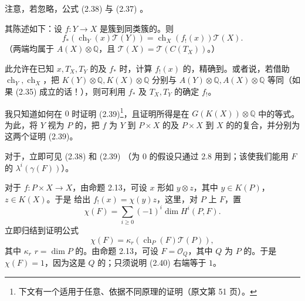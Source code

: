 注意，若忽略，公式 (2.38) 与 (2.37) 。

其陈述如下：设 $f:Y\to X$ 是簇到同类簇的。则
\[
f_*(\operatorname{ch}_Y(x)\mathscr T(Y))=\operatorname{ch}_X(f_!(x))\mathscr T(X).\tag{2.39}
\]
（两端均属于 $A(X)\otimes\mathbb Q$，且 $\mathscr T(X)=\mathscr T(C(T_X))$。）

此允许在已知 $x,T_X,T_Y$ 的及 $f_*$ 时，计算 $f_!(x)$ 的，精确到。或者说，若借助 $\operatorname{ch}_Y,\operatorname{ch}_X$，把 $K(Y)\otimes\mathbb Q,K(X)\otimes\mathbb Q$ 分别与 $A(Y)\otimes\mathbb Q,A(X)\otimes\mathbb Q$ 等同（如果 (2.35) 成立的话！），则可利用 $f_*$ 及 $T_X,T_Y$ 的确定 $f_!$。

我只知道如何在 $0$ 时证明 (2.39)\footnote{下文有一个适用于任意、依据不同原理的证明（原文第 51 页）。}，且证明所得是在 $G(K(X))\otimes\mathbb Q$ 中的等式。为此，将 $Y$ 视为 $P$ 的，把 $f$ 为 $Y$ 到 $P\times X$ 的及 $P\times X$ 到 $X$ 的的复合，并分别为这两个证明 (2.39)。

对于，立即可见 (2.38) 和 (2.39) （为 $0$ 的假设只通过 2.8 用到；该使我们能用 $F$ 的 $\lambda^i(\gamma(F))$）。

对于 $f:P\times X\to X$，由命题 2.13，可设 $x$ 形如 $y\otimes z$，其中 $y\in K(P)$，
$z\in K(X)$。于是 给出 $f_!(x)=\chi(y)z$，这里，对 $P$ 上 $F$，置
\[
\chi(F)=\sum_{i\geq0}(-1)^i\dim H^i(P,F).
\]
立即归结到证明公式
\[
\chi(F)=\kappa_r(\operatorname{ch}_P(F)\mathscr T(P)),\tag{2.40}
\]
其中 $\kappa_r$  $r=\dim P$ 的。由命题 2.13，可设 $F=\mathcal O_Q$，其中 $Q$ 为 $P$ 的。于是 $\chi(F)=1$，因为这是 $Q$ 的；只须说明 (2.40) 右端等于 $1$。

